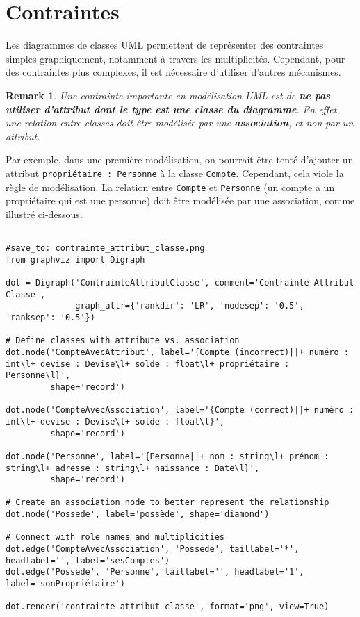 \documentclass{article}
\newtheorem{remark}{Remark}
\begin{document}
\section{Contraintes}

Les diagrammes de classes UML permettent de représenter des contraintes simples graphiquement, notamment à travers les multiplicités. Cependant, pour des contraintes plus complexes, il est nécessaire d'utiliser d'autres mécanismes.

\begin{remark}
Une contrainte importante en modélisation UML est de \textbf{ne pas utiliser d'attribut dont le type est une classe du diagramme}.  En effet, une relation entre classes doit être modélisée par une \textbf{association}, et non par un attribut.
\end{remark}


Par exemple, dans une première modélisation, on pourrait être tenté d'ajouter un attribut \texttt{propriétaire : Personne} à la classe \texttt{Compte}.  Cependant, cela viole la règle de modélisation. La relation entre \texttt{Compte} et \texttt{Personne} (un compte a un propriétaire qui est une personne) doit être modélisée par une association, comme illustré ci-dessous.

\begin{verbatim}

#save_to: contrainte_attribut_classe.png
from graphviz import Digraph

dot = Digraph('ContrainteAttributClasse', comment='Contrainte Attribut Classe', 
              graph_attr={'rankdir': 'LR', 'nodesep': '0.5', 'ranksep': '0.5'})

# Define classes with attribute vs. association
dot.node('CompteAvecAttribut', label='{Compte (incorrect)||+ numéro : int\l+ devise : Devise\l+ solde : float\l+ propriétaire : Personne\l}', 
         shape='record')

dot.node('CompteAvecAssociation', label='{Compte (correct)||+ numéro : int\l+ devise : Devise\l+ solde : float\l}', 
         shape='record')

dot.node('Personne', label='{Personne||+ nom : string\l+ prénom : string\l+ adresse : string\l+ naissance : Date\l}', 
         shape='record')

# Create an association node to better represent the relationship
dot.node('Possede', label='possède', shape='diamond')

# Connect with role names and multiplicities
dot.edge('CompteAvecAssociation', 'Possede', taillabel='*', headlabel='', label='sesComptes')
dot.edge('Possede', 'Personne', taillabel='', headlabel='1', label='sonPropriétaire')

dot.render('contrainte_attribut_classe', format='png', view=True)


\end{verbatim}
\end{document}
